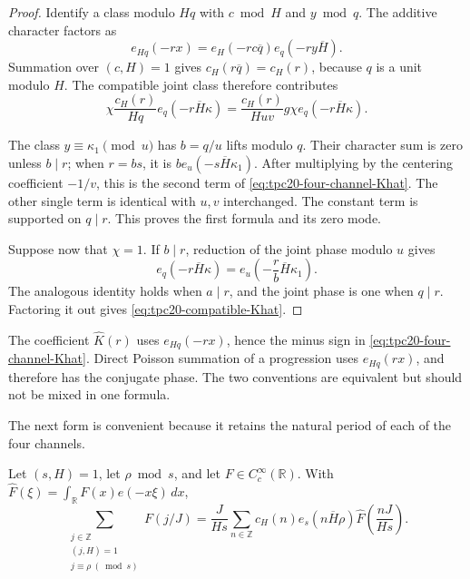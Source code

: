 \begin{proof}
Identify a class modulo \(Hq\) with \(c\bmod H\) and \(y\bmod q\).
The additive character factors as
\[
 e_{Hq}(-rx)
 =e_H(-rc\overline q)e_q(-ry\overline H).
\]
Summation over \((c,H)=1\) gives
\(c_H(r\overline q)=c_H(r)\), because \(q\) is a unit modulo \(H\).
The compatible joint class therefore contributes
\[
 \chi\frac{c_H(r)}{Hq}e_q(-r\overline H\kappa)
 =\frac{c_H(r)}{Huv}g\chi e_q(-r\overline H\kappa).
\]

The class \(y\equiv\kappa_1\pmod u\) has \(b=q/u\) lifts modulo \(q\).
Their character sum is zero unless \(b\mid r\); when \(r=bs\), it is
\(b e_u(-s\overline H\kappa_1)\).  After multiplying by the centering
coefficient \(-1/v\), this is the second term of
\eqref{eq:tpc20-four-channel-Khat}.  The other single term is identical
with \(u,v\) interchanged.  The constant term is supported on
\(q\mid r\).  This proves the first formula and its zero mode.

Suppose now that \(\chi=1\).  If \(b\mid r\), reduction of the joint
phase modulo \(u\) gives
\[
 e_q(-r\overline H\kappa)
 =e_u\!\left(-\frac rb\overline H\kappa_1\right).
\]
The analogous identity holds when \(a\mid r\), and the joint phase is
one when \(q\mid r\).  Factoring it out gives
\eqref{eq:tpc20-compatible-Khat}.
\end{proof}

\begin{remark}
\label{rem:tpc20-phase-sign}
The coefficient \(\widehat K(r)\) uses \(e_{Hq}(-rx)\), hence the minus
sign in \eqref{eq:tpc20-four-channel-Khat}.  Direct Poisson summation of
a progression uses \(e_{Hq}(rx)\), and therefore has the conjugate phase.
The two conventions are equivalent but should not be mixed in one formula.
\end{remark}

The next form is convenient because it retains the natural period of each
of the four channels.

\begin{lemma}
\label{lem:tpc20-progression-poisson}
Let \((s,H)=1\), let \(\rho\bmod s\), and let
\(F\in C_c^\infty(\mathbb R)\).  With
\(\widehat F(\xi)=\int_{\mathbb R}F(x)e(-x\xi)\,dx\),
\begin{equation}
 \sum_{\substack{j\in\mathbb Z\\(j,H)=1\\j\equiv\rho\ (\bmod s)}}
 F(j/J)
 =\frac{J}{Hs}\sum_{n\in\mathbb Z}
 c_H(n)e_s(n\overline H\rho)
 \widehat F\!\left(\frac{nJ}{Hs}\right).
 \label{eq:tpc20-progression-poisson}
\end{equation}
\end{lemma}

